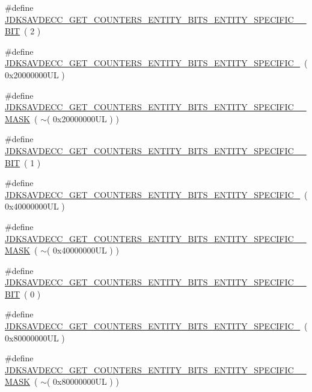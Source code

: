 \begin{DoxyCompactItemize}
\item 
\#define \hyperlink{group__get__counters__entity__bits_gaae1afcdcd31615df604e8fc7e32a0aa6}{J\+D\+K\+S\+A\+V\+D\+E\+C\+C\+\_\+\+G\+E\+T\+\_\+\+C\+O\+U\+N\+T\+E\+R\+S\+\_\+\+E\+N\+T\+I\+T\+Y\+\_\+\+B\+I\+T\+S\+\_\+\+E\+N\+T\+I\+T\+Y\+\_\+\+S\+P\+E\+C\+I\+F\+I\+C\+\_\+\_\+\+B\+IT}~( 2 )
\item 
\#define \hyperlink{group__get__counters__entity__bits_gabf947619e9a2964895a5fac0a404e423}{J\+D\+K\+S\+A\+V\+D\+E\+C\+C\+\_\+\+G\+E\+T\+\_\+\+C\+O\+U\+N\+T\+E\+R\+S\+\_\+\+E\+N\+T\+I\+T\+Y\+\_\+\+B\+I\+T\+S\+\_\+\+E\+N\+T\+I\+T\+Y\+\_\+\+S\+P\+E\+C\+I\+F\+I\+C\+\_}~( 0x20000000\+U\+L )
\item 
\#define \hyperlink{group__get__counters__entity__bits_ga46429c8faca58317a3a5ea6cee460623}{J\+D\+K\+S\+A\+V\+D\+E\+C\+C\+\_\+\+G\+E\+T\+\_\+\+C\+O\+U\+N\+T\+E\+R\+S\+\_\+\+E\+N\+T\+I\+T\+Y\+\_\+\+B\+I\+T\+S\+\_\+\+E\+N\+T\+I\+T\+Y\+\_\+\+S\+P\+E\+C\+I\+F\+I\+C\+\_\+\_\+\+M\+A\+SK}~( $\sim$( 0x20000000\+U\+L ) )
\item 
\#define \hyperlink{group__get__counters__entity__bits_gae1fbed20c93a00e31717f2a564c2e0bc}{J\+D\+K\+S\+A\+V\+D\+E\+C\+C\+\_\+\+G\+E\+T\+\_\+\+C\+O\+U\+N\+T\+E\+R\+S\+\_\+\+E\+N\+T\+I\+T\+Y\+\_\+\+B\+I\+T\+S\+\_\+\+E\+N\+T\+I\+T\+Y\+\_\+\+S\+P\+E\+C\+I\+F\+I\+C\+\_\+\_\+\+B\+IT}~( 1 )
\item 
\#define \hyperlink{group__get__counters__entity__bits_gad42a23392bc9486b90039b6c8be053f1}{J\+D\+K\+S\+A\+V\+D\+E\+C\+C\+\_\+\+G\+E\+T\+\_\+\+C\+O\+U\+N\+T\+E\+R\+S\+\_\+\+E\+N\+T\+I\+T\+Y\+\_\+\+B\+I\+T\+S\+\_\+\+E\+N\+T\+I\+T\+Y\+\_\+\+S\+P\+E\+C\+I\+F\+I\+C\+\_}~( 0x40000000\+U\+L )
\item 
\#define \hyperlink{group__get__counters__entity__bits_gab694a45660dcf133b164d9f96dd39310}{J\+D\+K\+S\+A\+V\+D\+E\+C\+C\+\_\+\+G\+E\+T\+\_\+\+C\+O\+U\+N\+T\+E\+R\+S\+\_\+\+E\+N\+T\+I\+T\+Y\+\_\+\+B\+I\+T\+S\+\_\+\+E\+N\+T\+I\+T\+Y\+\_\+\+S\+P\+E\+C\+I\+F\+I\+C\+\_\+\_\+\+M\+A\+SK}~( $\sim$( 0x40000000\+U\+L ) )
\item 
\#define \hyperlink{group__get__counters__entity__bits_ga1e75be3ac64395352cb672e25ca65dd8}{J\+D\+K\+S\+A\+V\+D\+E\+C\+C\+\_\+\+G\+E\+T\+\_\+\+C\+O\+U\+N\+T\+E\+R\+S\+\_\+\+E\+N\+T\+I\+T\+Y\+\_\+\+B\+I\+T\+S\+\_\+\+E\+N\+T\+I\+T\+Y\+\_\+\+S\+P\+E\+C\+I\+F\+I\+C\+\_\+\_\+\+B\+IT}~( 0 )
\item 
\#define \hyperlink{group__get__counters__entity__bits_ga920998263d90f279185df8842c199443}{J\+D\+K\+S\+A\+V\+D\+E\+C\+C\+\_\+\+G\+E\+T\+\_\+\+C\+O\+U\+N\+T\+E\+R\+S\+\_\+\+E\+N\+T\+I\+T\+Y\+\_\+\+B\+I\+T\+S\+\_\+\+E\+N\+T\+I\+T\+Y\+\_\+\+S\+P\+E\+C\+I\+F\+I\+C\+\_}~( 0x80000000\+U\+L )
\item 
\#define \hyperlink{group__get__counters__entity__bits_ga059c9c6e392090eb71b4ff582f999e16}{J\+D\+K\+S\+A\+V\+D\+E\+C\+C\+\_\+\+G\+E\+T\+\_\+\+C\+O\+U\+N\+T\+E\+R\+S\+\_\+\+E\+N\+T\+I\+T\+Y\+\_\+\+B\+I\+T\+S\+\_\+\+E\+N\+T\+I\+T\+Y\+\_\+\+S\+P\+E\+C\+I\+F\+I\+C\+\_\+\_\+\+M\+A\+SK}~( $\sim$( 0x80000000\+U\+L ) )
\end{DoxyCompactItemize}


